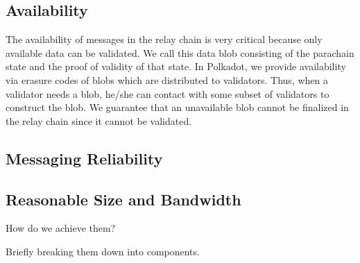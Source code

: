  \subsection{Availability}
The availability of messages in the relay chain is very critical because only available data can be validated. We call this data blob consisting of the parachain state and the proof of validity of that state. In Polkadot, we provide availability via erasure codes of blobs which are distributed to validators. Thus, when a validator needs a blob, he/she can contact with some subset of validators to construct the blob. We guarantee that an unavailable blob cannot be finalized in the relay chain since it cannot be validated.

 \subsection{Messaging Reliability}

 \subsection{Reasonable Size and Bandwidth}

 How do we achieve them?

 Briefly breaking them down into components.
 
 

